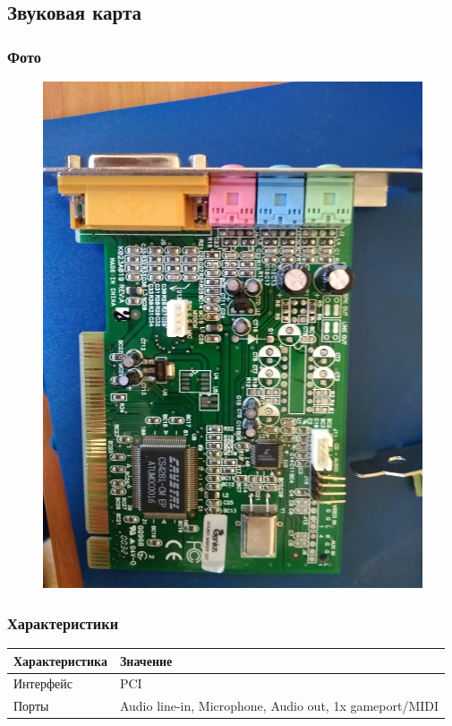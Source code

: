 \documentclass[a4paper]{article}
\begin{document}
\subsection{Звуковая карта}
\subsubsection{Фото}
\begin{figure}[H]
\centering
\includegraphics[scale=0.1]{sc.jpg} 
\end{figure}
\subsubsection{Характеристики}
\begin{table}[H]
    \centering
    \begin{tabular}{|l|l|}
    \hline
    Характеристика & Значение \\
    \hline
    Интерфейс & PCI \\
    Порты & Audio line-in, Microphone, Audio out,  1x gameport/MIDI \\
    \hline
\end{tabular}
\end{table}
\end{document}
